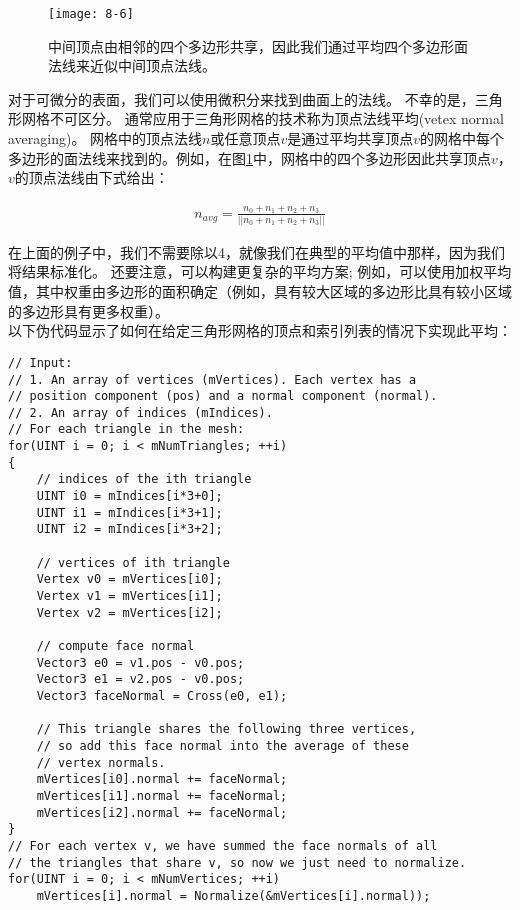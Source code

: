 \begin{figure}[h]
    \texttt{[image: 8-6]}
    \centering
    \caption{中间顶点由相邻的四个多边形共享，因此我们通过平均四个多边形面法线来近似中间顶点法线。}
    \label{fig:8-6}
\end{figure}

\begin{flushleft}
对于可微分的表面，我们可以使用微积分来找到曲面上的法线。 不幸的是，三角形网格不可区分。 通常应用于三角形网格的技术称为顶点法线平均(vetex normal averaging)。 网格中的顶点法线$n$或任意顶点$v$是通过平均共享顶点$v$的网格中每个多边形的面法线来找到的。例如，在图\ref{fig:8-6}中，网格中的四个多边形因此共享顶点$v$， $v$的顶点法线由下式给出：\\
\end{flushleft}

\begin{align*}
n_{avg}=\frac{n_{0}+n_{1}+n_{2}+n_{3}}{||n_{0}+n_{1}+n_{2}+n_{3}||}
\end{align*}

\begin{flushleft}
在上面的例子中，我们不需要除以4，就像我们在典型的平均值中那样，因为我们将结果标准化。 还要注意，可以构建更复杂的平均方案; 例如，可以使用加权平均值，其中权重由多边形的面积确定（例如，具有较大区域的多边形比具有较小区域的多边形具有更多权重）。\\
以下伪代码显示了如何在给定三角形网格的顶点和索引列表的情况下实现此平均：\\
\end{flushleft}

\begin{lstlisting}
// Input:
// 1. An array of vertices (mVertices). Each vertex has a
// position component (pos) and a normal component (normal).
// 2. An array of indices (mIndices).
// For each triangle in the mesh:
for(UINT i = 0; i < mNumTriangles; ++i)
{
    // indices of the ith triangle
    UINT i0 = mIndices[i*3+0];
    UINT i1 = mIndices[i*3+1];
    UINT i2 = mIndices[i*3+2];

    // vertices of ith triangle
    Vertex v0 = mVertices[i0];
    Vertex v1 = mVertices[i1];
    Vertex v2 = mVertices[i2];

    // compute face normal
    Vector3 e0 = v1.pos - v0.pos;
    Vector3 e1 = v2.pos - v0.pos;
    Vector3 faceNormal = Cross(e0, e1);

    // This triangle shares the following three vertices,
    // so add this face normal into the average of these
    // vertex normals.
    mVertices[i0].normal += faceNormal;
    mVertices[i1].normal += faceNormal;
    mVertices[i2].normal += faceNormal;
}
// For each vertex v, we have summed the face normals of all
// the triangles that share v, so now we just need to normalize.
for(UINT i = 0; i < mNumVertices; ++i)
    mVertices[i].normal = Normalize(&mVertices[i].normal));
\end{lstlisting}

